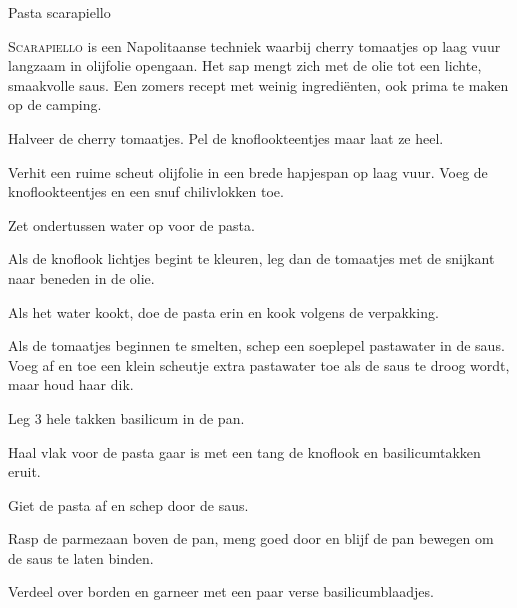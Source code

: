 \begin{recipe}{Pasta scarapiello}


\lettrine{S}{carapiello} is een Napolitaanse techniek waarbij cherry tomaatjes op laag
vuur langzaam in olijfolie opengaan. Het sap mengt zich met de olie tot een lichte,
smaakvolle saus. Een zomers recept met weinig ingrediënten, ook prima te maken op de camping.

\begin{ingredients}
\end{ingredients}

\begin{steps}
  \item Halveer de cherry tomaatjes. Pel de knoflookteentjes maar laat ze heel.
  \item Verhit een ruime scheut olijfolie in een brede hapjespan op laag vuur. Voeg de
        knoflookteentjes en een snuf chilivlokken toe.
  \item Zet ondertussen water op voor de pasta.
  \item Als de knoflook lichtjes begint te kleuren, leg dan de tomaatjes met de
        snijkant naar beneden in de olie.
  \item Als het water kookt, doe de pasta erin en kook volgens de verpakking.
  \item Als de tomaatjes beginnen te smelten, schep een soeplepel pastawater in de
        saus. Voeg af en toe een klein scheutje extra pastawater toe als de saus te
        droog wordt, maar houd haar dik.
  \item Leg 3 hele takken basilicum in de pan.
  \item Haal vlak voor de pasta gaar is met een tang de knoflook en basilicumtakken
        eruit.
  \item Giet de pasta af en schep door de saus.
  \item Rasp de parmezaan boven de pan, meng goed door en blijf de pan bewegen om de
        saus te laten binden.
  \item Verdeel over borden en garneer met een paar verse basilicumblaadjes.
\end{steps}
\end{recipe}
